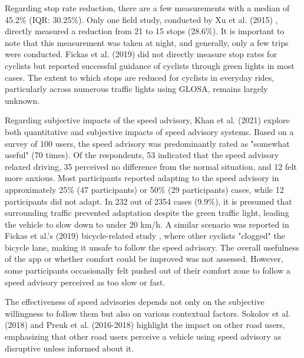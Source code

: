 Regarding stop rate reduction, there are a few measurements with a median of 45.2\% (IQR: 30.25\%). Only one field study, conducted by Xu et al. (2015) \cite{xu_bb_2015}, directly measured a reduction from 21 to 15 stops (28.6\%). It is important to note that this measurement was taken at night, and generally, only a few trips were conducted. Fickas et al. (2019) \cite{fickas_fast_2019} did not directly measure stop rates for cyclists but reported successful guidance of cyclists through green lights in most cases. The extent to which stops are reduced for cyclists in everyday rides, particularly across numerous traffic lights using GLOSA, remains largely unknown.

Regarding subjective impacts of the speed advisory, Khan et al. (2021) \cite{khan_eco-drive_2021} explore both quantitative and subjective impacts of speed advisory systems. Based on a survey of 100 users, the speed advisory was predominantly rated as "somewhat useful" (70 times). Of the respondents, 53 indicated that the speed advisory relaxed driving, 35 perceived no difference from the normal situation, and 12 felt more anxious. Most participants reported adapting to the speed advisory in approximately 25\% (47 participants) or 50\% (29 participants) cases, while 12 participants did not adapt. In 232 out of 2354 cases (9.9\%), it is presumed that surrounding traffic prevented adaptation despite the green traffic light, leading the vehicle to slow down to under 20 km/h. A similar scenario was reported in Fickas et al.'s (2019) bicycle-related study \cite{fickas_fast_2019}, where other cyclists "clogged" the bicycle lane, making it unsafe to follow the speed advisory. The overall usefulness of the app or whether comfort could be improved was not assessed. However, some participants occasionally felt pushed out of their comfort zone to follow a speed advisory perceived as too slow or fast.

The effectiveness of speed advisories depends not only on the subjective willingness to follow them but also on various contextual factors. Sokolov et al. (2018) \cite{sokolov_effects_2018} and Preuk et al. (2016-2018) \cite{preuk_does_2016, preuk_should_2018} highlight the impact on other road users, emphasizing that other road users perceive a vehicle using speed advisory as disruptive unless informed about it.

